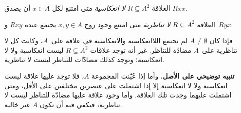 \documentclass[../../../include/open-logic-section]{subfiles}
\begin{document}
\begin{defn}[اللاانعكاسية]
العلاقة $R \subseteq A^2$ \emph{لا انعكاسية} متى امتنع لكل $x \in
A$ أن يصدق $Rxx$.
\end{defn}

\begin{defn}[اللاتناظرية]
العلاقة $R \subseteq A^2$ \emph{لا تناظرية} متى امتنع وجود زوج
$x,y\in A$ يجتمع عنده $Rxy$ و~$Ryx$.
\end{defn}

فإذا كان $A \neq \emptyset$ لم تجتمع اللاانعكاسية والانعكاسية في
علاقة على~$A$، وكانت كل لا تناظرية على~$A$ مضادّة للتناظر.
غير أنه توجد علاقات $R \subseteq A^2$ ليست انعكاسية ولا لا انعكاسية؛
وتوجد كذلك مضادّات للتناظر ليست لا تناظرية.

\textbf{تنبيه توضيحي على الأصل.} وأما إذا عُيّنت المجموعة $A$، فلا توجد
عليها علاقة ليست انعكاسية ولا لا انعكاسية إلا إذا اشتملت على عنصرين
مختلفين على الأقل، ومتى اشتملت عليهما وجدت تلك العلاقة. وأما وجود
علاقة عليها مضادّة للتناظر ليست لا تناظرية، فيكفي فيه أن تكون $A$ غير خالية.
\end{document}

